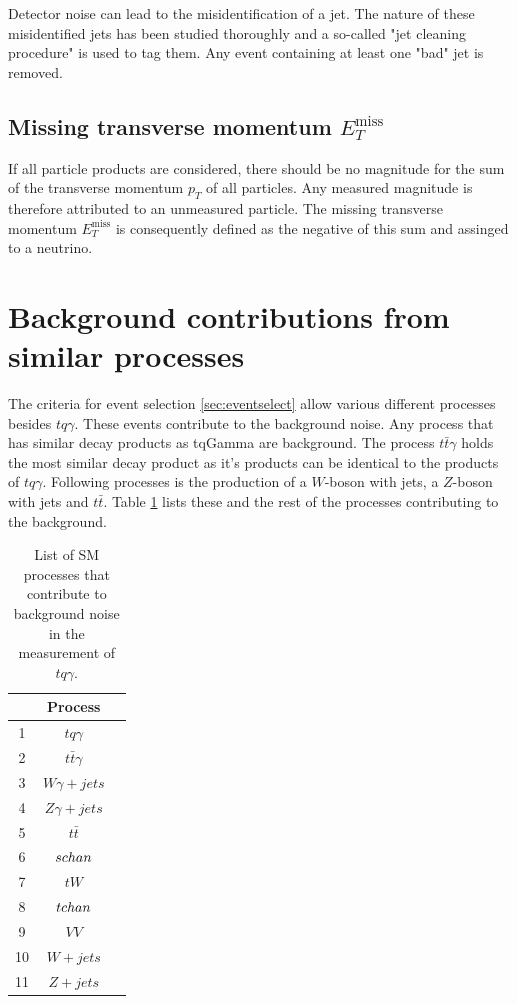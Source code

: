 Detector noise can lead to the misidentification of a jet. The nature of these misidentified jets has been studied thoroughly \cite{70} and a so-called "jet cleaning procedure" is used to tag them. 
Any event containing at least one "bad" jet is removed. 

\subsection{Missing transverse momentum \texorpdfstring{$E_T^{\text{miss}}$}{}}

If all particle products are considered, there should be no magnitude for the sum of the transverse momentum $p_T$ of all particles. 
Any measured magnitude is therefore attributed to an unmeasured particle. The missing transverse momentum $E_T^{\text{miss}}$ is consequently defined as the negative of this sum and assinged to a neutrino. 

\section{Background contributions from similar processes}



The criteria for event selection \ref{sec:eventselect} allow various different processes besides $tq\gamma$. These events contribute to the background noise. Any process that has similar decay products as tqGamma are background. 
The process $t\bar{t}\gamma$ holds the most similar decay product as it's products can be identical to the products of $tq\gamma$. Following processes is the production of a $W$-boson with jets, a $Z$-boson with jets and $t\bar{t}$. 
Table \ref{tab:background} lists these and the rest of the processes contributing to the background.
\begin{table}
    \centering
    \begin{tabular}{c c c}
        \toprule
        {} & Process \\
        \midrule
        1 & $tq\gamma$\\[.1cm]
        2 & $t\bar{t}\gamma$\\[.1cm]
        3 & $W\gamma + jets$\\[.1cm]
        4 & $Z\gamma + jets$\\[.1cm]
        5 & $t\bar{t}$\\[.1cm]
        6 & $s\-chan$\\[.1cm]
        7 & $t W$\\[.1cm]
        8 & $t\-chan$\\[.1cm]
        9 & $VV$\\[.1cm]
        10& $W+jets$\\[.1cm]
        11& $Z+jets$\\[.1cm]
        \bottomrule
    \end{tabular}
    \caption{List of SM processes that contribute to background noise in the measurement of $tq\gamma$.}
    \label{tab:background}
\end{table}



